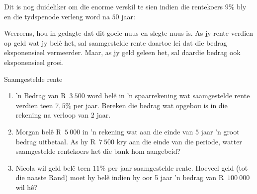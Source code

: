 Dit is nog duideliker om die enorme verskil te sien indien die rentekoers $9\%$ bly en die tydspenode verleng word na $50$ jaar:\\

\begin{figure}[H]
    \begin{center}
	\label{FG:fig:SI10}
    \end{center}
\end{figure}

Weereens, hou in gedagte dat dit goeie nuus en slegte nuus is. As jy rente verdien op geld wat jy belê het,
sal saamgestelde rente daartoe lei dat die bedrag eksponensieel vermeerder. Maar, as jy geld geleen het, sal
daardie bedrag ook eksponensieel groei.


\begin{exercises}{Saamgestelde rente}
{
    \begin{enumerate}[label=\textbf{\arabic*}.]
	\item ’n Bedrag van R~$3~500$ word belê in ’n spaarrekening wat saamgestelde rente verdien teen $7,5\%$ per jaar.
Bereken die bedrag wat opgebou is in die rekening na verloop van 2 jaar.

	\item Morgan bel\^e R~$5~000$ in 'n rekening wat aan die einde van $5$ jaar 'n groot bedrag uitbetaal. As hy R~$7~500$ kry aan die einde van die periode, watter saamgestelde rentekoers het die bank hom aangebeid?

	\item Nicola wil geld belê teen  $11\%$ per jaar saamgestelde rente. Hoeveel geld (tot die naaste Rand) moet hy belê
indien hy oor 5 jaar ’n bedrag van R~$100~000$ wil hê?
    \end{enumerate}

}
\end{exercises}




